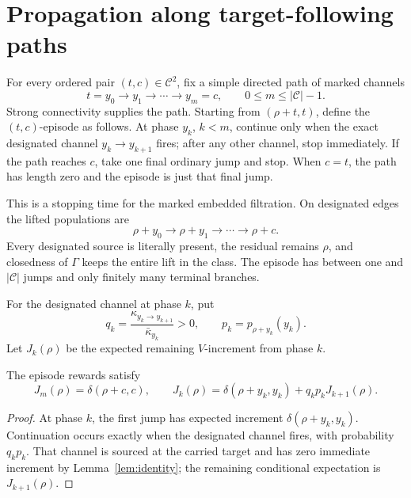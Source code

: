 \section{Propagation along target-following paths}\label{sec:paths}

For every ordered pair \((t,c)\in\mathcal C^2\), fix a simple directed path
of marked channels
\begin{equation}\label{eq:path}
 t=y_0\longrightarrow y_1\longrightarrow\cdots
 \longrightarrow y_m=c,
 \qquad 0\le m\le|\mathcal C|-1.
\end{equation}
Strong connectivity supplies the path.  Starting from \((\rho+t,t)\), define
the \((t,c)\)-episode as follows.  At phase \(y_k\), \(k<m\), continue only
when the exact designated channel \(y_k\to y_{k+1}\) fires; after any other
channel, stop immediately.  If the path reaches \(c\), take one final
ordinary jump and stop.  When \(c=t\), the path has length zero and the
episode is just that final jump.

This is a stopping time for the marked embedded filtration.  On designated
edges the lifted populations are
\begin{equation}\label{eq:lift}
  \rho+y_0\longrightarrow \rho+y_1\longrightarrow\cdots\longrightarrow \rho+c.
\end{equation}
Every designated source is literally present, the residual remains \(\rho\),
and closedness of \(\Gamma\) keeps the entire lift in the class.  The episode
has between one and \(|\mathcal C|\) jumps and only finitely many terminal
branches.

For the designated channel at phase \(k\), put
\begin{equation}\label{eq:qk}
 q_k=\frac{\kappa_{y_k\to y_{k+1}}}{\bar\kappa_{y_k}}>0,
 \qquad p_k=p_{\rho+y_k}(y_k).
\end{equation}
Let \(J_k(\rho)\) be the expected remaining \(V\)-increment from phase \(k\).

\begin{lemma}\label{lem:recursion}
The episode rewards satisfy
\begin{equation}\label{eq:recursion}
  J_m(\rho)=\delta(\rho+c,c),
  \qquad
  J_k(\rho)=\delta(\rho+y_k,y_k)+q_kp_kJ_{k+1}(\rho).
\end{equation}
\end{lemma}

\begin{proof}
At phase \(k\), the first jump has expected increment
\(\delta(\rho+y_k,y_k)\).  Continuation occurs exactly when the designated channel
fires, with probability \(q_kp_k\).  That channel is sourced at the carried
target and has zero immediate increment by Lemma~\ref{lem:identity}; the
remaining conditional expectation is \(J_{k+1}(\rho)\).
\end{proof}

